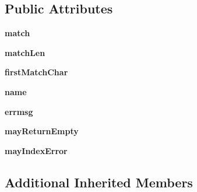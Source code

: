 \subsection*{Public Attributes}
\begin{DoxyCompactItemize}
\item 
\mbox{\label{classpkg__resources_1_1__vendor_1_1pyparsing_1_1_literal_a83789374482c801753304343287fd8d4}} 
{\bfseries match}
\item 
\mbox{\label{classpkg__resources_1_1__vendor_1_1pyparsing_1_1_literal_a3fde914473e208702a039e58081cf0be}} 
{\bfseries match\+Len}
\item 
\mbox{\label{classpkg__resources_1_1__vendor_1_1pyparsing_1_1_literal_aec4f3f98aed13658904caa5c0a6c209f}} 
{\bfseries first\+Match\+Char}
\item 
\mbox{\label{classpkg__resources_1_1__vendor_1_1pyparsing_1_1_literal_afa4486ddd889e03d88c49014e22fdde0}} 
{\bfseries name}
\item 
\mbox{\label{classpkg__resources_1_1__vendor_1_1pyparsing_1_1_literal_a6169396e891b64d7ef283c239a612bb1}} 
{\bfseries errmsg}
\item 
\mbox{\label{classpkg__resources_1_1__vendor_1_1pyparsing_1_1_literal_ab0af42a4a656bcb7f907087f5a5e6192}} 
{\bfseries may\+Return\+Empty}
\item 
\mbox{\label{classpkg__resources_1_1__vendor_1_1pyparsing_1_1_literal_aea07276f0ad0b03b665b95021cd1ff06}} 
{\bfseries may\+Index\+Error}
\end{DoxyCompactItemize}
\subsection*{Additional Inherited Members}


